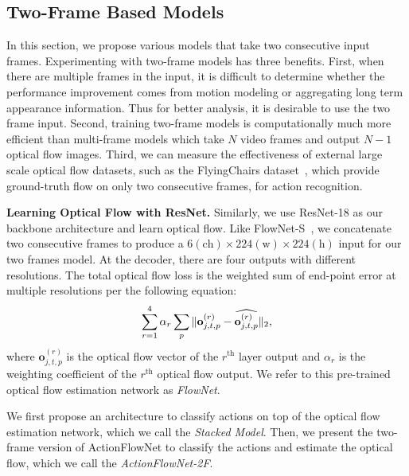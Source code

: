 \documentclass[10pt,twocolumn,letterpaper]{article}
\begin{document}
\subsection{Two-Frame Based Models}
\label{sec:models}
In this section, we propose various models that take two consecutive input frames.
Experimenting with two-frame models has three benefits.
First, when there are multiple frames in the input, it is difficult to determine whether the performance improvement comes from motion modeling or aggregating long term appearance information.
Thus for better analysis, it is desirable to use the two frame input.
Second, training two-frame models is computationally much more efficient than multi-frame models which take $N$ video frames and output $N-1$ optical flow images.
Third, we can measure the effectiveness of external large scale optical flow datasets, such as the FlyingChairs dataset~\cite{FischerDIHHGSCB15}, which provide ground-truth flow on only two consecutive frames, for action recognition.

\noindent\textbf{Learning Optical Flow with ResNet.}
Similarly, we use ResNet-18 as our backbone architecture and learn optical flow.
Like FlowNet-S~\cite{FischerDIHHGSCB15}, we concatenate two consecutive frames to produce a $6(\text{ch})\times224(\text{w})\times224(\text{h})$ input for our two frames model.
At the decoder, there are four outputs with different resolutions.
The total optical flow loss is the weighted sum of end-point error at multiple resolutions per the following equation:
\vspace{-.5em}
\begin{equation}
    \sum_{r=1}^{4} \alpha_r \sum_{p} \|\mathbf{o}_{j,t,p}^{(r)} - \widehat{\mathbf{o}_{j,t,p}^{(r)}} \|_2,
	\label{eq:loss_epe}
\vspace{-.5em}
\end{equation}
where $\mathbf{o}_{j,t,p}^{(r)}$ is the optical flow vector of the $r^\text{th}$ layer output and
$\alpha_r$ is the weighting coefficient of the $r^\text{th}$ optical flow output.
We refer to this pre-trained optical flow estimation network as \emph{FlowNet}.

We first propose an architecture to classify actions on top of the optical flow estimation network, which we call the \emph{Stacked Model}.
Then, we present the two-frame version of ActionFlowNet to classify the actions and estimate the
optical flow, which we call the \emph{ActionFlowNet-2F}.
\end{document}
